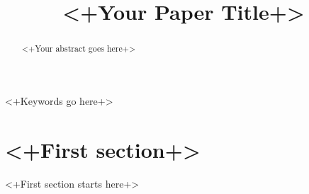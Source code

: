 \documentclass[journal]{IEEEtran}
\begin{document}
\title{<+Your Paper Title+>}


\maketitle
\begin{abstract}
  <+Your abstract goes here+>
\end{abstract}
\begin{IEEEkeywords}
<+Keywords go here+>
\end{IEEEkeywords}
\section{<+First section+>}
<+First section starts here+>

\balance

 

\end{document}
